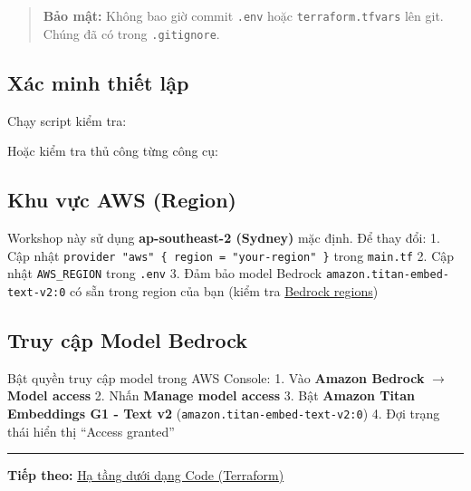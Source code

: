 \begin{quote}
\textbf{Bảo mật:} Không bao giờ commit \texttt{.env} hoặc
\texttt{terraform.tfvars} lên git. Chúng đã có trong
\texttt{.gitignore}.
\end{quote}

\hypertarget{xuxe1c-minh-thiux1ebft-lux1eadp}{%
\subsection{Xác minh thiết lập}}

Chạy script kiểm tra:

\begin{Shaded}
\begin{Highlighting}[]
\end{Highlighting}
\end{Shaded}

Hoặc kiểm tra thủ công từng công cụ:

\begin{Shaded}
\begin{Highlighting}[]
  
\end{Highlighting}
\end{Shaded}

\hypertarget{khu-vux1ef1c-aws-region}{%
\subsection{Khu vực AWS (Region)}}

Workshop này sử dụng \textbf{ap-southeast-2 (Sydney)} mặc định. Để thay
đổi: 1. Cập nhật
\texttt{provider\ "aws"\ \{\ region\ =\ "your-region"\ \}} trong
\texttt{main.tf} 2. Cập nhật \texttt{AWS\_REGION} trong \texttt{.env} 3.
Đảm bảo model Bedrock \texttt{amazon.titan-embed-text-v2:0} có sẵn trong
region của bạn (kiểm tra
\href{https://docs.aws.amazon.com/bedrock/latest/userguide/models-regions.html}{Bedrock
regions})

\hypertarget{truy-cux1eadp-model-bedrock}{%
\subsection{Truy cập Model Bedrock}}

Bật quyền truy cập model trong AWS Console: 1. Vào \textbf{Amazon
Bedrock} \(\rightarrow\) \textbf{Model access} 2. Nhấn \textbf{Manage
model access} 3. Bật \textbf{Amazon Titan Embeddings G1 - Text v2}
(\texttt{amazon.titan-embed-text-v2:0}) 4. Đợi trạng thái hiển thị
``Access granted''

\begin{center}\rule{0.5\linewidth}{0.5pt}\end{center}

\textbf{Tiếp theo:} \href{5.3-Infrastructure/}{Hạ tầng dưới dạng Code
(Terraform)}
